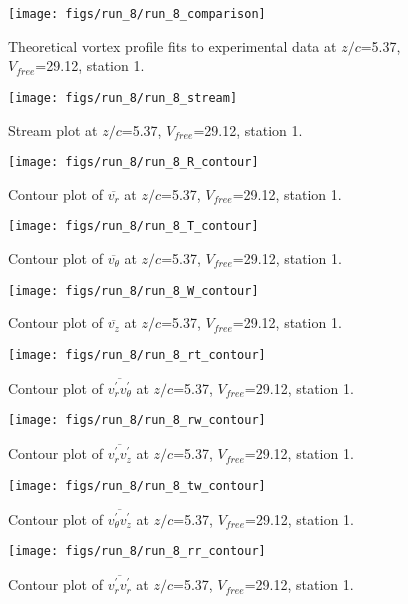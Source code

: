\begin{figure}[H]
\centering
\texttt{[image: figs/run\_8/run\_8\_comparison]}
\caption{Theoretical vortex profile fits to experimental data at $z/c$=5.37, $V_{free}$=29.12, station 1.}
\end{figure}


\begin{figure}[H]
\centering
\texttt{[image: figs/run\_8/run\_8\_stream]}
\caption{Stream plot at $z/c$=5.37, $V_{free}$=29.12, station 1.}
\end{figure}


\begin{figure}[H]
\centering
\texttt{[image: figs/run\_8/run\_8\_R\_contour]}
\caption{Contour plot of $\overline{v_{r}}$ at $z/c$=5.37, $V_{free}$=29.12, station 1.}
\end{figure}


\begin{figure}[H]
\centering
\texttt{[image: figs/run\_8/run\_8\_T\_contour]}
\caption{Contour plot of $\overline{v_{\theta}}$ at $z/c$=5.37, $V_{free}$=29.12, station 1.}
\end{figure}


\begin{figure}[H]
\centering
\texttt{[image: figs/run\_8/run\_8\_W\_contour]}
\caption{Contour plot of $\overline{v_{z}}$ at $z/c$=5.37, $V_{free}$=29.12, station 1.}
\end{figure}


\begin{figure}[H]
\centering
\texttt{[image: figs/run\_8/run\_8\_rt\_contour]}
\caption{Contour plot of $\overline{v_{r}^{\prime} v_{\theta}^{\prime}}$ at $z/c$=5.37, $V_{free}$=29.12, station 1.}
\end{figure}


\begin{figure}[H]
\centering
\texttt{[image: figs/run\_8/run\_8\_rw\_contour]}
\caption{Contour plot of $\overline{v_{r}^{\prime} v_{z}^{\prime}}$ at $z/c$=5.37, $V_{free}$=29.12, station 1.}
\end{figure}


\begin{figure}[H]
\centering
\texttt{[image: figs/run\_8/run\_8\_tw\_contour]}
\caption{Contour plot of $\overline{v_{\theta}^{\prime} v_{z}^{\prime}}$ at $z/c$=5.37, $V_{free}$=29.12, station 1.}
\end{figure}


\begin{figure}[H]
\centering
\texttt{[image: figs/run\_8/run\_8\_rr\_contour]}
\caption{Contour plot of $\overline{v_{r}^{\prime} v_{r}^{\prime}}$ at $z/c$=5.37, $V_{free}$=29.12, station 1.}
\end{figure}


